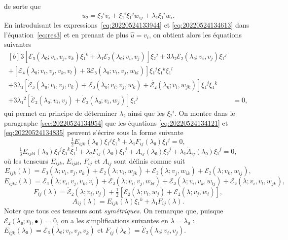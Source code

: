 \documentclass[12pt, final]{amsart}
\theoremstyle{definition}
\begin{document}
de sorte que
\begin{equation}
  \label{eq:20220524134613}
  u₂ = ξ₂^i v_i + ξ₁^i ξ₁^j w_{ij} + λ₁ ξ₁^i w_i .
\end{equation}
En introduisant les expressions~\eqref{eq:20220524133944} et
\eqref{eq:20220524134613} dans l'équation~\eqref{eq:res3} et en prenant de plus
\(\hat{u} = v_i\), on obtient alors les équations suivantes
\begin{equation}
  \begin{aligned}[b]
    3[ℰ₃(λ₀; v_i, v_j, v_k) ξ₁^k + λ₁ \dot{ℰ}₂(λ₀; v_i, v_j)] ξ₂^j + 3λ₂ \dot{ℰ}₂(λ₀; v_i, v_j) ξ₁^j &\\
    + [ℰ₄(λ₀; v_i, v_j, v_k, v_l) + 3ℰ₃(λ₀; v_i, v_j, w_{kl})] ξ₁^j ξ₁^k ξ₁^l &\\
    + 3λ₁ [\dot{ℰ}₃(λ₀; v_i, v_j, v_k) + ℰ₃(λ₀; v_i, v_j, w_k) + \dot{ℰ₂}(λ₀; v_i, w_{jk})] ξ₁^j ξ₁^k&\\
    + 3λ₁^2 [\ddot{ℰ}₂(λ₀; v_i, v_j) + \dot{ℰ}₂(λ₀ ; v_i, w_j)] ξ₁^j &= 0,
  \end{aligned}
  \label{eq:20220524134835}
\end{equation}
qui permet en principe de déterminer \(λ₂\) ainsi que les \(ξ₂^i\). On montre
dans le paragraphe \ref{sec:20220524134954} que les équations
\eqref{eq:20220524134121} et \eqref{eq:20220524134835} peuvent s'écrire sous la
forme suivante
\begin{equation}
  \label{eq:20220524135036}
  \tfrac{1}{2} E_{ijk}(λ₀) ξ₁^j ξ₁^k + λ₁ F_{ij}(λ₀) ξ₁^j = 0,
\end{equation}
\begin{equation}
  \label{eq:bifurcation 2b}
  \tfrac{1}{3} E_{ijkl}(λ₀) ξ₁^j ξ₁^k ξ₁^l + λ₂ F_{ij}(λ₀) ξ₁^j + A_{ij}(λ₀) ξ₂^j + λ₁ \dot{A}_{ij}(λ₀) ξ₁^j = 0,
\end{equation}
où les tenseurs \(E_{i j k}\), \(E_{i j k l}\), \(F_{i j}\) et \(A_{i j}\) sont
définis comme suit 
\begin{equation}
  \label{eq:20220524135619}
  E_{ijk}(λ) = ℰ₃(λ; v_i, v_j, v_k) + ℰ₂(λ; v_i, w_{jk}) + ℰ₂(λ; v_j, w_{ik}) + ℰ₂(λ ; v_k, w_{ij}),
\end{equation}
\begin{equation}
 \label{eq:20220524135553} E_{i j k l}(λ)
 =ℰ₄(λ ; v_i, v_j, v_k, v_l) +ℰ₃(λ ;
 v_i, v_j, w_{k l}) +ℰ₃(λ ; v_i, v_k, w_{l
  j}) +ℰ₃(λ ; v_i, v_l, w_{j k}),
\end{equation}
\begin{equation}
  \label{eq:20220524135643}
  F_{ij}(λ) = \dot{ℰ}₂(λ; v_i, v_j) + \tfrac{1}{2} [ℰ₂(λ; v_i, w_j) + ℰ₂(λ; v_j, w_i)],
\end{equation}
\begin{equation}
  \label{eq:20220524135705}
  A_{ij}(λ) = E_{ijk}(λ) ξ₁^k + λ₁ F_{ij}(λ) .
\end{equation}
Noter que tous ces tenseurs sont \emph{symétriques}. On remarque que, puisque
\(ℰ₂(λ₀ ; v_i, •) = 0\), on a les simplifications suivantes en \(λ = λ₀\) :
\(E_{ijk}(λ₀) = ℰ₃(λ₀; v_i, v_j, v_k)\) et
\(F_{ij}(λ₀) = \dot{ℰ}₂(λ₀; v_i, v_j)\).
\end{document}

